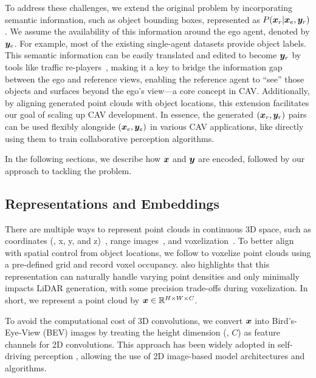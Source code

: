  
To address these challenges, we extend the original problem by incorporating semantic information, such as object bounding boxes, represented as $P({\bm{x}}_r|{\bm{x}}_e, {\bm{y}}_r)$. We assume the availability of this information around the ego agent, denoted by ${\bm{y}}_e$. For example, most of the existing single-agent datasets provide object labels. 
This semantic information can be easily translated and edited to become ${\bm{y}}_r$ by tools like traffic re-players~\citep{gulino2024waymax}, making it a key to bridge the information gap between the ego and reference views, enabling the reference agent to ``see'' those objects and surfaces beyond the ego’s view---a core concept in CAV. %
Additionally, by aligning generated point clouds with object locations, this extension facilitates our goal of scaling up CAV development.
In essence, the generated $({\bm{x}}_r, {\bm{y}}_r)$ pairs can be used flexibly alongside $({\bm{x}}_e, {\bm{y}}_e)$ in various CAV applications, like directly using them to train collaborative perception algorithms.
 
In the following sections, we describe how ${\bm{x}}$ and ${\bm{y}}$ are encoded, followed by our approach to tackling the problem.

\subsection{Representations and Embeddings}
\label{sec:input}

 There are multiple ways to represent point clouds in continuous 3D space, such as coordinates (\ie, x, y, and z)~\citep{qi2017pointnet,qi2017pointnet++,shi2019pointrcnn}, range images~\citep{qi2017pointnet, wu2018squeezeseg, milioto2019rangenet++}, and voxelization~\citep{maturana2015voxnet,lang2019pointpillars,yan2018second,zhou2018voxelnet}. To better align with spatial control from object locations, we follow \citep{xiong2023ultralidar} to voxelize point clouds using a pre-defined grid and record voxel occupancy. \citep{xiong2023ultralidar} also highlights that this representation can naturally handle varying point densities and only minimally impacts LiDAR generation, with some precision trade-offs during voxelization. In short, we represent a point cloud by ${\bm{x}} \in {\mathbb{R}}^{H \times W \times C}$. 

To avoid the computational cost of 3D convolutions, we convert ${\bm{x}}$ into Bird’s-Eye-View (BEV) images by treating the height dimension (\ie, $C$) as feature channels for 2D convolutions. This approach has been widely adopted in self-driving perception \citep{chen2017multi,zhang2018efficient,xiong2023learning}, allowing the use of 2D image-based model architectures and algorithms.

